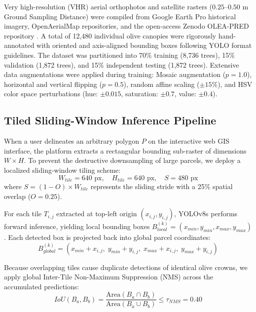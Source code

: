 \documentclass[runningheads]{llncs}
\begin{document}
Very high-resolution (VHR) aerial orthophotos and satellite rasters ($0.25$--$0.50\text{ m}$ Ground Sampling Distance) were compiled from Google Earth Pro historical imagery, OpenAerialMap repositories, and the open-access Zenodo OLEA-PRED repository \cite{ref11}. A total of 12,480 individual olive canopies were rigorously hand-annotated with oriented and axis-aligned bounding boxes following YOLO format guidelines. The dataset was partitioned into 70\% training (8,736 trees), 15\% validation (1,872 trees), and 15\% independent testing (1,872 trees). Extensive data augmentations were applied during training: Mosaic augmentation ($p=1.0$), horizontal and vertical flipping ($p=0.5$), random affine scaling ($\pm 15\%$), and HSV color space perturbations (hue: $\pm 0.015$, saturation: $\pm 0.7$, value: $\pm 0.4$).

\subsection{Tiled Sliding-Window Inference Pipeline}
When a user delineates an arbitrary polygon $P$ on the interactive web GIS interface, the platform extracts a rectangular bounding sub-raster of dimensions $W \times H$. To prevent the destructive downsampling of large parcels, we deploy a localized sliding-window tiling scheme:
\begin{equation}
W_{tile} = 640\text{ px}, \quad H_{tile} = 640\text{ px}, \quad S = 480\text{ px}
\end{equation}
where $S = (1 - O) \times W_{tile}$ represents the sliding stride with a 25\% spatial overlap ($O = 0.25$).

For each tile $T_{i,j}$ extracted at top-left origin $(x_{i,j}, y_{i,j})$, YOLOv8s performs forward inference, yielding local bounding boxes $B_{local}^{(k)} = (x_{min}, y_{min}, x_{max}, y_{max})$. Each detected box is projected back into global parcel coordinates:
\begin{equation}
B_{global}^{(k)} = \left( x_{min} + x_{i,j}, \; y_{min} + y_{i,j}, \; x_{max} + x_{i,j}, \; y_{max} + y_{i,j} \right)
\end{equation}

Because overlapping tiles cause duplicate detections of identical olive crowns, we apply global Inter-Tile Non-Maximum Suppression (NMS) across the accumulated predictions:
\begin{equation}
IoU(B_a, B_b) = \frac{\text{Area}(B_a \cap B_b)}{\text{Area}(B_a \cup B_b)} \le \tau_{NMS} = 0.40
\end{equation}
\end{document}

